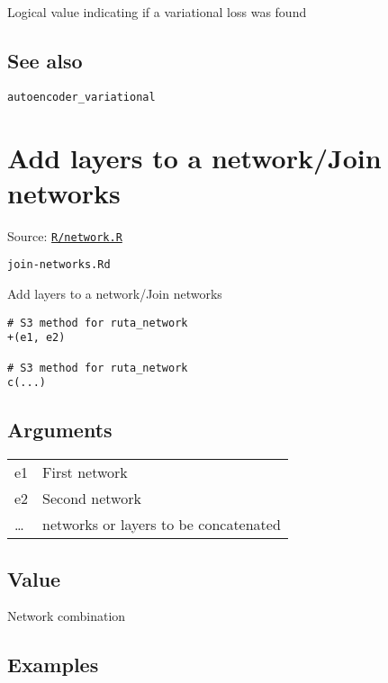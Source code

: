 Logical value indicating if a variational loss was found

\hypertarget{see-also}{\subsection{\texorpdfstring{\protect\hyperlink{see-also}{}See
also}{See also}}\label{see-also}}

\texttt{autoencoder\_variational}

\section{Add layers to a network/Join
networks}\label{add-layers-to-a-networkjoin-networks}

Source:
\href{https://github.com/fdavidcl/ruta/blob/master/R/network.R}{\texttt{R/network.R}}

\texttt{join-networks.Rd}

Add layers to a network/Join networks

\begin{verbatim}
# S3 method for ruta_network
+(e1, e2)

# S3 method for ruta_network
c(...)
\end{verbatim}

\hypertarget{arguments}{\subsection{\texorpdfstring{\protect\hyperlink{arguments}{}Arguments}{Arguments}}\label{arguments}}

\begin{longtable}[c]{@{}ll@{}}
\toprule
e1 & First network\tabularnewline
e2 & Second network\tabularnewline
\ldots{} & networks or layers to be concatenated\tabularnewline
\bottomrule
\end{longtable}

\hypertarget{value}{\subsection{\texorpdfstring{\protect\hyperlink{value}{}Value}{Value}}\label{value}}

Network combination

\hypertarget{examples}{\subsection{\texorpdfstring{\protect\hyperlink{examples}{}Examples}{Examples}}\label{examples}}

